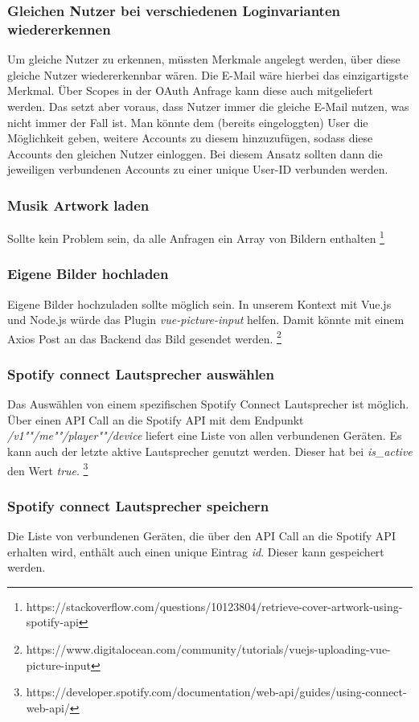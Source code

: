 \documentclass[10pt, a4paper, draft]{article}
\begin{document}
\subsubsection{Gleichen Nutzer bei verschiedenen Loginvarianten wiedererkennen}
Um gleiche Nutzer zu erkennen, müssten Merkmale angelegt werden, über diese gleiche Nutzer wiedererkennbar wären.
Die E-Mail wäre hierbei das einzigartigste Merkmal. Über Scopes in der OAuth Anfrage kann diese auch mitgeliefert werden.
Das setzt aber voraus, dass Nutzer immer die gleiche E-Mail nutzen, was nicht immer der Fall ist.
Man könnte dem (bereits eingeloggten) User die Möglichkeit geben, weitere Accounts zu diesem hinzuzufügen, sodass diese Accounts den gleichen Nutzer einloggen.
Bei diesem Ansatz sollten dann die jeweiligen verbundenen Accounts zu einer unique User-ID verbunden werden.

\subsubsection{Musik Artwork laden}
Sollte kein Problem sein, da alle Anfragen ein Array von Bildern enthalten \footnote{https://stackoverflow.com/questions/10123804/retrieve-cover-artwork-using-spotify-api}

\subsubsection{Eigene Bilder hochladen}
Eigene Bilder hochzuladen sollte möglich sein. In unserem Kontext mit Vue.js und Node.js würde das Plugin \textit{vue-picture-input} helfen.
Damit könnte mit einem Axios Post an das Backend das Bild gesendet werden. \footnote{https://www.digitalocean.com/community/tutorials/vuejs-uploading-vue-picture-input}

\subsubsection{Spotify connect Lautsprecher auswählen}
Das Auswählen von einem spezifischen Spotify Connect Lautsprecher ist möglich.
Über einen API Call an die Spotify API mit dem Endpunkt \textit{/v1""/me""/player""/device} liefert eine Liste von allen verbundenen Geräten.
Es kann auch der letzte aktive Lautsprecher genutzt werden. Dieser hat bei \textit{is\_active} den Wert \textit{true}. \footnote{https://developer.spotify.com/documentation/web-api/guides/using-connect-web-api/}

\subsubsection{Spotify connect Lautsprecher speichern}
Die Liste von verbundenen Geräten, die über den API Call an die Spotify API erhalten wird, enthält auch einen unique Eintrag \textit{id}. Dieser kann gespeichert werden.
\end{document}
